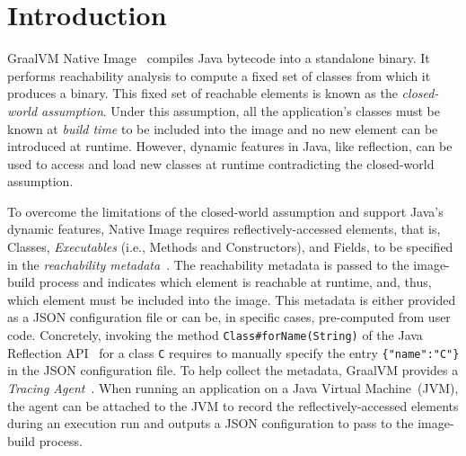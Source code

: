 \chapter{Introduction}


GraalVM Native Image~\cite{noauthor_native_nodate} compiles Java bytecode into a standalone binary.  It performs reachability analysis to compute a fixed set of classes from which it produces a binary. This fixed set of reachable elements is known as the \emph{closed-world assumption}.
Under this assumption, all the application's classes must be known at \emph{build time} to be included into the image and no new element can be introduced at runtime.
However, dynamic features in Java, like reflection, can be used to access and load new classes at runtime contradicting the closed-world assumption.
 
To overcome the limitations of the closed-world assumption and support Java's dynamic features, Native Image requires reflectively-accessed elements, that is, Classes, \emph{Executables} (i.e., Methods and Constructors), and Fields, to be specified in the \emph{reachability metadata}~\cite{noauthor_reachability_nodate}. The reachability metadata is passed to the image-build process and indicates which element is reachable at runtime, and, thus, which element must be included into the image. This metadata is either provided as a JSON configuration file or can be, in specific cases, pre-computed from user code. Concretely, invoking the method \verb|Class#forName(String)| of the Java Reflection API~\cite{noauthor_core_nodate} for a class \verb|C| requires to manually specify the entry \verb|{"name":"C"}| in the JSON configuration file.
To help collect the metadata, GraalVM provides a \emph{Tracing Agent}~\cite{noauthor_collect_nodate}. When running an application on a Java Virtual Machine~(JVM), the agent can be attached to the JVM to record the reflectively-accessed elements during an execution run and outputs a JSON configuration to pass to the image-build process.

